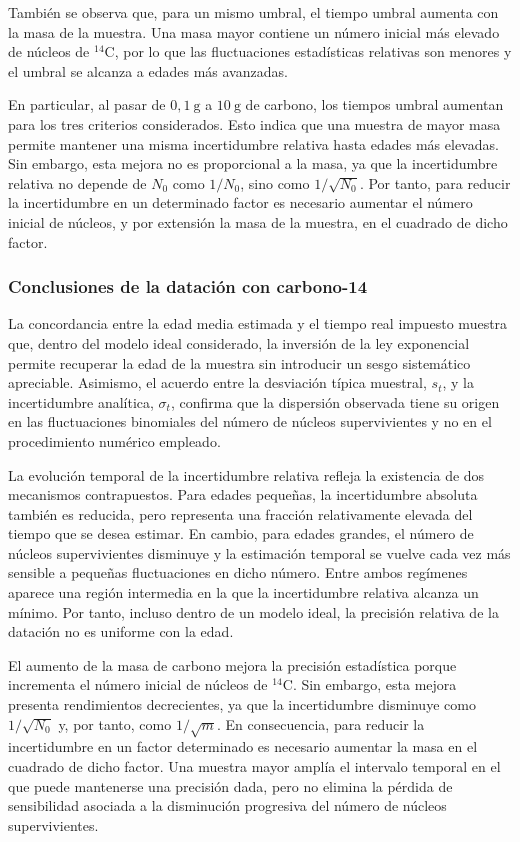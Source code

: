 \documentclass[12pt,a4paper]{article}
\begin{document}
También se observa que, para un mismo umbral, el tiempo umbral aumenta con la masa de la muestra. Una masa mayor contiene un número inicial más elevado de núcleos de $^{14}\text{C}$, por lo que las fluctuaciones estadísticas relativas son menores y el umbral se alcanza a edades más avanzadas.

En particular, al pasar de $0{,}1\ \text{g}$ a $10\ \text{g}$ de carbono, los tiempos umbral aumentan para los tres criterios considerados. Esto indica que una muestra de mayor masa permite mantener una misma incertidumbre relativa hasta edades más elevadas. Sin embargo, esta mejora no es proporcional a la masa, ya que la incertidumbre relativa no depende de $N_0$ como $1/N_0$, sino como $1/\sqrt{N_0}$. Por tanto, para reducir la incertidumbre en un determinado factor es necesario aumentar el número inicial de núcleos, y por extensión la masa de la muestra, en el cuadrado de dicho factor.

\subsubsection{Conclusiones de la datación con carbono-14}

La concordancia entre la edad media estimada y el tiempo real impuesto muestra que, dentro del modelo ideal considerado, la inversión de la ley exponencial permite recuperar la edad de la muestra sin introducir un sesgo sistemático apreciable. Asimismo, el acuerdo entre la desviación típica muestral, $s_t$, y la incertidumbre analítica, $\sigma_t$, confirma que la dispersión observada tiene su origen en las fluctuaciones binomiales del número de núcleos supervivientes y no en el procedimiento numérico empleado.

La evolución temporal de la incertidumbre relativa refleja la existencia de dos mecanismos contrapuestos. Para edades pequeñas, la incertidumbre absoluta también es reducida, pero representa una fracción relativamente elevada del tiempo que se desea estimar. En cambio, para edades grandes, el número de núcleos supervivientes disminuye y la estimación temporal se vuelve cada vez más sensible a pequeñas fluctuaciones en dicho número. Entre ambos regímenes aparece una región intermedia en la que la incertidumbre relativa alcanza un mínimo. Por tanto, incluso dentro de un modelo ideal, la precisión relativa de la datación no es uniforme con la edad.

El aumento de la masa de carbono mejora la precisión estadística porque incrementa el número inicial de núcleos de $^{14}\text{C}$. Sin embargo, esta mejora presenta rendimientos decrecientes, ya que la incertidumbre disminuye como $1/\sqrt{N_0}$ y, por tanto, como $1/\sqrt{m}$. En consecuencia, para reducir la incertidumbre en un factor determinado es necesario aumentar la masa en el cuadrado de dicho factor. Una muestra mayor amplía el intervalo temporal en el que puede mantenerse una precisión dada, pero no elimina la pérdida de sensibilidad asociada a la disminución progresiva del número de núcleos supervivientes.
\end{document}
